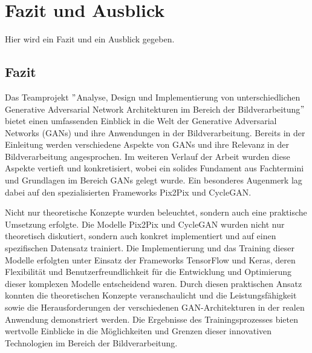 \chapter{Fazit und Ausblick}
Hier wird ein Fazit und ein Ausblick gegeben.

\section{Fazit}
Das Teamprojekt $"$Analyse, Design und Implementierung von unterschiedlichen Generative Adversarial Network Architekturen im Bereich der Bildverarbeitung$"$ bietet einen umfassenden Einblick in die Welt der Generative Adversarial Networks (GANs) und ihre Anwendungen in der Bildverarbeitung. Bereits in der Einleitung werden verschiedene Aspekte von GANs und ihre Relevanz in der Bildverarbeitung angesprochen. Im weiteren Verlauf der Arbeit wurden diese Aspekte vertieft und konkretisiert, wobei ein solides Fundament aus Fachtermini und Grundlagen im Bereich GANs gelegt wurde. Ein besonderes Augenmerk lag dabei auf den spezialisierten Frameworks Pix2Pix und CycleGAN.

Nicht nur theoretische Konzepte wurden beleuchtet, sondern auch eine praktische Umsetzung erfolgte. Die Modelle Pix2Pix und CycleGAN wurden nicht nur theoretisch diskutiert, sondern auch konkret implementiert und auf einen spezifischen Datensatz trainiert. Die Implementierung und das Training dieser Modelle erfolgten unter Einsatz der Frameworks TensorFlow und Keras, deren Flexibilität und Benutzerfreundlichkeit für die Entwicklung und Optimierung dieser komplexen Modelle entscheidend waren. Durch diesen praktischen Ansatz konnten die theoretischen Konzepte veranschaulicht und die Leistungsfähigkeit sowie die Herausforderungen der verschiedenen GAN-Architekturen in der realen Anwendung demonstriert werden. Die Ergebnisse des Trainingsprozesses bieten wertvolle Einblicke in die Möglichkeiten und Grenzen dieser innovativen Technologien im Bereich der Bildverarbeitung.